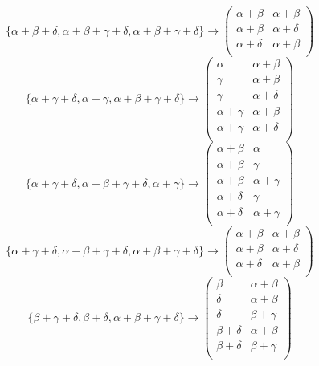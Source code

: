 \documentclass[12pt]{article}
\begin{document}
$$
\{\alpha +\beta +\delta ,\alpha +\beta +\gamma +\delta ,\alpha +\beta +\gamma +\delta \}\to \left(
\begin{array}{cc}
 \alpha +\beta  & \alpha +\beta  \\
 \alpha +\beta  & \alpha +\delta  \\
 \alpha +\delta  & \alpha +\beta  \\
\end{array}
\right)
$$
$$
\{\alpha +\gamma +\delta ,\alpha +\gamma ,\alpha +\beta +\gamma +\delta \}\to \left(
\begin{array}{cc}
 \alpha  & \alpha +\beta  \\
 \gamma  & \alpha +\beta  \\
 \gamma  & \alpha +\delta  \\
 \alpha +\gamma  & \alpha +\beta  \\
 \alpha +\gamma  & \alpha +\delta  \\
\end{array}
\right)
$$
$$
\{\alpha +\gamma +\delta ,\alpha +\beta +\gamma +\delta ,\alpha +\gamma \}\to \left(
\begin{array}{cc}
 \alpha +\beta  & \alpha  \\
 \alpha +\beta  & \gamma  \\
 \alpha +\beta  & \alpha +\gamma  \\
 \alpha +\delta  & \gamma  \\
 \alpha +\delta  & \alpha +\gamma  \\
\end{array}
\right)
$$
$$
\{\alpha +\gamma +\delta ,\alpha +\beta +\gamma +\delta ,\alpha +\beta +\gamma +\delta \}\to \left(
\begin{array}{cc}
 \alpha +\beta  & \alpha +\beta  \\
 \alpha +\beta  & \alpha +\delta  \\
 \alpha +\delta  & \alpha +\beta  \\
\end{array}
\right)
$$
$$
\{\beta +\gamma +\delta ,\beta +\delta ,\alpha +\beta +\gamma +\delta \}\to \left(
\begin{array}{cc}
 \beta  & \alpha +\beta  \\
 \delta  & \alpha +\beta  \\
 \delta  & \beta +\gamma  \\
 \beta +\delta  & \alpha +\beta  \\
 \beta +\delta  & \beta +\gamma  \\
\end{array}
\right)
$$
\end{document}
